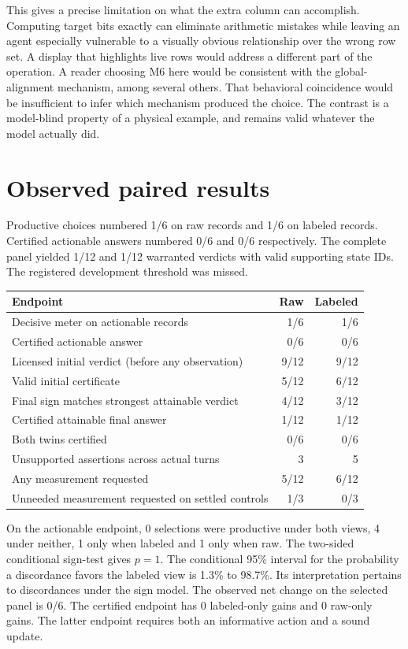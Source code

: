 \documentclass[12pt,letterpaper]{article}
\begin{document}
This gives a precise limitation on what the extra column can accomplish. Computing target bits exactly can eliminate arithmetic mistakes while leaving an agent especially vulnerable to a visually obvious relationship over the wrong row set. A display that highlights live rows would address a different part of the operation. A reader choosing M6 here would be consistent with the global-alignment mechanism, among several others. That behavioral coincidence would be insufficient to infer which mechanism produced the choice. The contrast is a model-blind property of a physical example, and remains valid whatever the model actually did.


\section{Observed paired results}

Productive choices numbered 1/6 on raw records and 1/6 on labeled records. Certified actionable answers numbered 0/6 and 0/6 respectively. The complete panel yielded 1/12 and 1/12 warranted verdicts with valid supporting state IDs. The registered development threshold was missed.

\begin{center}{\small\setlength{\tabcolsep}{4pt}\begin{tabularx}{\linewidth}{@{}Yrr@{}}\toprule
Endpoint & Raw & Labeled\\ \midrule
Decisive meter on actionable records & 1/6 & 1/6\\
Certified actionable answer & 0/6 & 0/6\\
Licensed initial verdict (before any observation) & 9/12 & 9/12\\
Valid initial certificate & 5/12 & 6/12\\
Final sign matches strongest attainable verdict & 4/12 & 3/12\\
Certified attainable final answer & 1/12 & 1/12\\
Both twins certified & 0/6 & 0/6\\
Unsupported assertions across actual turns & 3 & 5\\
Any measurement requested & 5/12 & 6/12\\
Unneeded measurement requested on settled controls & 1/3 & 0/3\\ \bottomrule\end{tabularx}}
\end{center}


On the actionable endpoint, 0 selections were productive under both views, 4 under neither, 1 only when labeled and 1 only when raw. The two-sided conditional sign-test gives $p=1$. The conditional 95\% interval for the probability a discordance favors the labeled view is 1.3\% to 98.7\%. Its interpretation pertains to discordances under the sign model. The observed net change on the selected panel is 0/6. The certified endpoint has 0 labeled-only gains and 0 raw-only gains. The latter endpoint requires both an informative action and a sound update.
\end{document}
